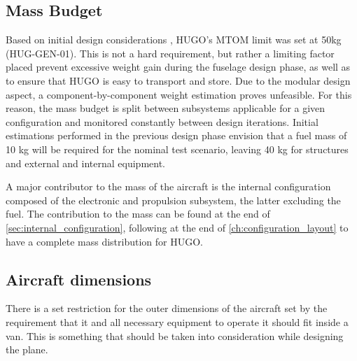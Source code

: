 \subsection{Mass Budget}
Based on initial design considerations , HUGO's MTOM limit was set at 50kg (HUG-GEN-01). This is not a hard requirement, but rather a limiting factor placed prevent excessive weight gain during the fuselage design phase, as well as to ensure that HUGO is easy to transport and store. Due to the modular design aspect, a component-by-component weight estimation proves unfeasible. For this reason, the mass budget is split between subsystems applicable for a given configuration and monitored constantly between design iterations. Initial estimations performed in the previous design phase   envision that a fuel mass of 10 kg will be required for the nominal test scenario, leaving 40 kg for structures and external and internal equipment.

A major contributor to the mass of the aircraft is the internal configuration composed of the electronic and propulsion subsystem, the latter excluding the fuel. The contribution to the mass can be found at the end of \autoref{sec:internal_configuration}, following at the end of \autoref{ch:configuration_layout} to have a complete mass distribution for HUGO.


\subsection{Aircraft dimensions} 
There is a set restriction for the outer dimensions of the aircraft set by the requirement that it and all necessary equipment to operate it should fit inside a van. This is something that should be taken into consideration while designing the plane. 

